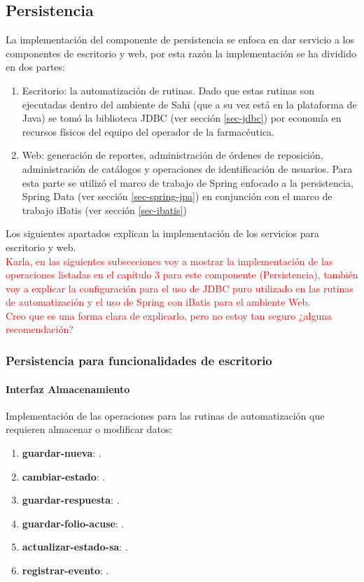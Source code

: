 \subsection{Persistencia}
La implementación del componente de persistencia se enfoca en dar servicio a los componentes de escritorio y web, por esta razón la implementación se ha dividido en dos partes:
\begin{enumerate}
 	\item Escritorio: la automatización de rutinas. Dado que estas rutinas son ejecutadas dentro del ambiente de Sahi (que a su vez está en la plataforma de Java) se tomó la biblioteca JDBC (ver sección \ref{sec-jdbc}) por economía en recursos físicos del equipo del operador de la farmacéutica.
 	\item Web: generación de reportes, administración de órdenes de reposición, administración de catálogos y operaciones de identificación  de usuarios. Para esta parte se utilizó el marco de trabajo de Spring enfocado a la persistencia, Spring Data (ver sección \ref{sec-spring-jpa}) en conjunción con el marco de trabajo iBatis (ver sección \ref{sec-ibatis})
\end{enumerate}
Los siguientes apartados explican la implementación de los servicios para escritorio y web.\\

\textcolor{red}{Karla, en las siguientes subsecciones voy a mostrar la implementación de las operaciones listadas en el capítulo 3 para este componente (Persistencia), también voy a explicar la configuración para el uso de JDBC puro utilizado en las rutinas de automatización y el uso de Spring con iBatis para el ambiente Web.\\
Creo que es una forma clara de explicarlo, pero no estoy tan seguro ¿alguna recomendación?}

\subsubsection{Persistencia para funcionalidades de escritorio}

\paragraph{\indent Interfaz Almacenamiento\\}
Implementación de las operaciones para las rutinas de automatización que requieren almacenar o modificar datos:
\begin{enumerate}
	\item \textbf{guardar-nueva}: .
	\item \textbf{cambiar-estado}: .
	\item \textbf{guardar-respuesta}: .
	\item \textbf{guardar-folio-acuse}: .
	\item \textbf{actualizar-estado-sa}: .
	\item \textbf{registrar-evento}: .
\end{enumerate}

